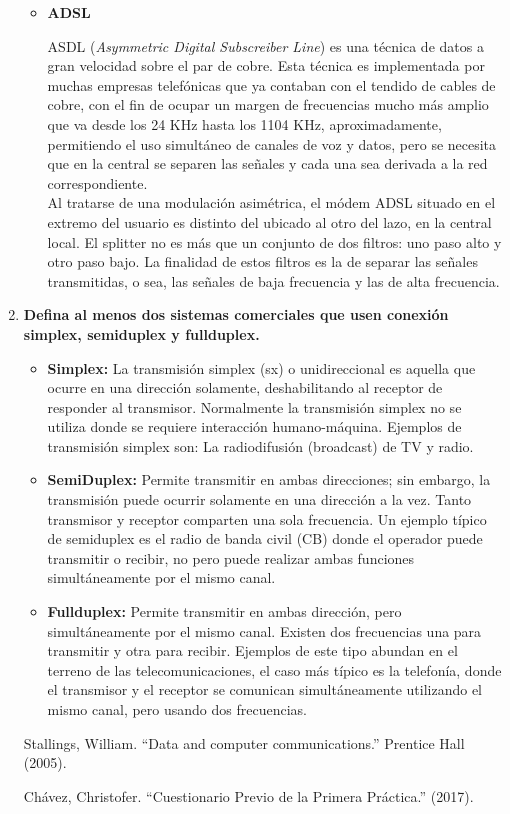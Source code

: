 \documentclass[a4paper,12pt]{article}
\begin{document}
\begin{enumerate}
\begin{itemize}
   \newpage
   
   \item \textbf{ADSL}
   
   ASDL (\textit{Asymmetric Digital Subscreiber Line}) es una técnica de datos a gran velocidad sobre el par de cobre.
   Esta técnica es implementada por muchas empresas telefónicas que ya contaban con el tendido de cables de cobre, con el fin de ocupar
   un margen de frecuencias mucho más amplio que va desde los 24 KHz hasta los 1104 KHz, aproximadamente, permitiendo el
   uso simultáneo de canales de voz y datos, pero se necesita que en la central se separen las señales y cada una sea derivada a la
   red correspondiente. \\
   Al tratarse de una modulación asimétrica, el módem ADSL situado en el extremo del usuario es distinto del ubicado al otro del lazo, en la central local.
   El splitter no es más que un conjunto de dos filtros: uno paso alto y otro paso bajo. La finalidad de estos filtros es la de separar las señales
   transmitidas, o sea, las señales de baja frecuencia y las de alta frecuencia.
  \end{itemize}

  
  
  \item \textbf{Defina al menos dos sistemas comerciales que usen conexión simplex, semiduplex y fullduplex.}
  
  \begin{itemize}
   \item \textbf{Simplex:} La transmisión simplex (sx) o unidireccional es aquella que ocurre en una dirección solamente, deshabilitando al receptor de responder al transmisor. Normalmente la transmisión simplex no se utiliza donde se requiere interacción humano-máquina.
   Ejemplos de transmisión simplex son: La radiodifusión (broadcast) de TV y radio.
   \item \textbf{SemiDuplex:} Permite transmitir en ambas direcciones; sin embargo, la transmisión puede ocurrir solamente en una dirección a la vez. Tanto transmisor y receptor comparten una sola frecuencia. Un ejemplo típico de semiduplex es el radio de banda civil (CB) donde el operador puede transmitir o recibir, no pero puede realizar ambas funciones simultáneamente por el mismo canal.
   \item \textbf{Fullduplex:} Permite transmitir en ambas dirección, pero simultáneamente por el mismo canal. Existen dos frecuencias una para transmitir y otra para recibir. Ejemplos de este tipo abundan en el terreno de las telecomunicaciones, el caso más típico es la telefonía, donde el transmisor y el receptor se comunican simultáneamente utilizando el mismo canal, pero usando dos frecuencias. 
  \end{itemize}

\begin{thebibliography}{1}

Stallings, William. ``Data and computer communications.'' Prentice Hall (2005).

Chávez, Christofer. ``Cuestionario Previo de la Primera Práctica.'' (2017).

\end{thebibliography}
  
\end{enumerate}
\end{document}
